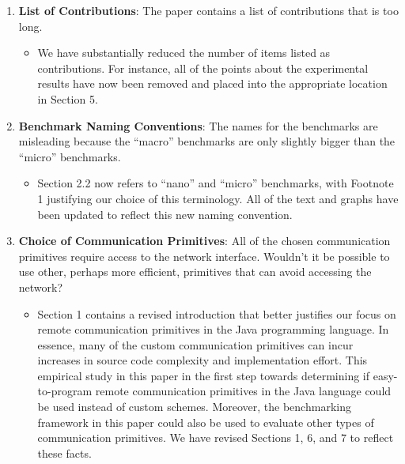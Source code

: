 \documentclass[11pt]{article}
\begin{document}
\begin{enumerate}

  \item {\bf List of Contributions}: The paper contains a list of
    contributions that is too long.

    \begin{itemize}
      
      \item We have substantially reduced the number of items listed
        as contributions.  For instance, all of the points about the
        experimental results have now been removed and placed into the
        appropriate location in Section 5.

    \end{itemize}

  \item {\bf Benchmark Naming Conventions}: The names for the
    benchmarks are misleading because the ``macro'' benchmarks are
    only slightly bigger than the ``micro'' benchmarks.

    \begin{itemize}
      
      \item Section 2.2 now refers to ``nano'' and ``micro''
        benchmarks, with Footnote 1 justifying our choice of this
        terminology.  All of the text and graphs have been updated to
        reflect this new naming convention.

    \end{itemize}

  \item {\bf Choice of Communication Primitives}: All of the chosen
    communication primitives require access to the network interface.
    Wouldn't it be possible to use other, perhaps more efficient,
    primitives that can avoid accessing the network?

    \begin{itemize}
      
      \item Section 1 contains a revised introduction that better
        justifies our focus on remote communication primitives in the
        Java programming language.  In essence, many of the custom
        communication primitives can incur increases in source code
        complexity and implementation effort.  This empirical study in
        this paper in the first step towards determining if
        easy-to-program remote communication primitives in the Java
        language could be used instead of custom schemes.  Moreover,
        the benchmarking framework in this paper could also be used to
        evaluate other types of communication primitives.  We have
        revised Sections 1, 6, and 7 to reflect these facts.


\end{itemize}
\end{enumerate}
\end{document}
